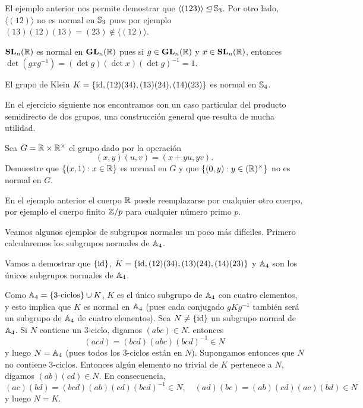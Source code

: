 \begin{example}
El ejemplo anterior nos permite demostrar que $\langle (123)\rangle\unlhd\mathbb{S}_3$. Por otro lado, $\langle (12)\rangle$ no es normal en $\mathbb{S}_3$ pues
por ejemplo $(13)(12)(13)=(23)\not\in\langle(12)\rangle$. 
\end{example}

\begin{example}
$\mathbf{SL}_n(\mathbb{R})$ es normal en $\mathbf{GL}_n(\mathbb{R})$ pues si $g\in\mathbf{GL}_n(\mathbb{R})$ y $x\in\mathbf{SL}_n(\mathbb{R})$, entonces $\det(gxg^{-1})=(\det g)(\det x)(\det g)^{-1}=1$. 
\end{example}

\begin{example}
El grupo de Klein $K=\{\operatorname{id},(12)(34),(13)(24),(14)(23)\}$ es normal en $\mathbb{S}_4$. 
\end{example}


En el ejercicio siguiente nos encontramos con un caso particular del producto semidirecto de dos grupos, una construcción general que resulta de mucha utilidad. 

\begin{exercise}
Sea $G=\mathbb{R}\times\mathbb{R}^\times$ el grupo dado por la operación 
\[
(x,y)(u,v)=(x+yu,yv).
\]	
Demuestre que $\{(x,1):x\in\mathbb{R}\}$ es normal en $G$ y que $\{(0,y):y\in(\mathbb{R})^\times\}$ no es normal en $G$. 
\end{exercise}

En el ejemplo anterior el cuerpo $\mathbb{R}$ puede reemplazarse por cualquier otro cuerpo, por ejemplo 
el cuerpo finito $\mathbb{Z}/p$ para cualquier número primo $p$. 
 
 
Veamos algunos ejemplos de subgrupos normales un poco más difíciles. Primero calcularemos los subgrupos normales de $\mathbb{A}_4$. 

\begin{example}
Vamos a demostrar que 
$\{\operatorname{id}\}$, $K=\{\operatorname{id},(12)(34),(13)(24),(14)(23)\}$ y $\mathbb{A}_4$ son los únicos subgrupos normales de $\mathbb{A}_4$. 
 	
Como $\mathbb{A}_4=\{\text{3-ciclos}\}\cup K$, $K$ es el único subgrupo de $\mathbb{A}_4$ con cuatro elementos, y esto implica que $K$ es normal en $\mathbb{A}_4$ (pues cada conjugado $gKg^{-1}$ también será un subgrupo de $\mathbb{A}_4$ de cuatro elementos). Sea $N\ne\{\operatorname{id}\}$ un subgrupo normal de $\mathbb{A}_4$. Si $N$ contiene un 3-ciclo, digamos
$(abc)\in N$. entonces
\[
(acd)=(bcd)(abc)(bcd)^{-1}\in N
\]
y luego $N=\mathbb{A}_4$ (pues todos los 3-ciclos están en $N$). Supongamos entonces que $N$ no contiene 3-ciclos. Entonces algún elemento no trivial de $K$ 
pertenece a $N$, digamos $(ab)(cd)\in N$. En consecuencia, 
\[
(ac)(bd)=(bcd)(ab)(cd)(bcd)^{-1}\in N,\quad
(ad)(bc)=(ab)(cd)(ac)(bd)\in N
\]
y luego $N=K$. 
\end{example}
 
